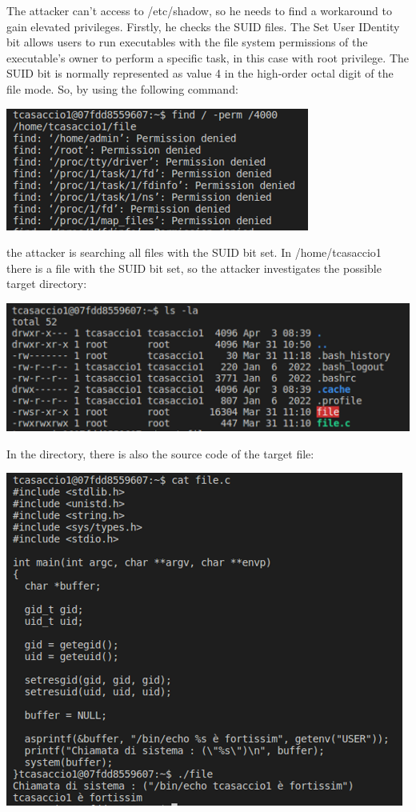 \documentclass[a4paper, 12pt, oneside]{extbook}
\begin{document}
The attacker can't access to /etc/shadow, so he needs to find a workaround to gain elevated privileges. 
Firstly, he checks the SUID files.
\newline The Set User IDentity bit allows users to run executables with the file system permissions
of the executable's owner to perform a specific task, in this case with root privilege.
The SUID bit is normally represented as value 4 in the high-order octal digit of the file mode.
\newline So, by using the following command:
\begin{center}
  \includegraphics[scale=1]{../Image/privilege_escalation_suid.PNG}
\end{center}
the attacker is searching all files with the SUID bit set. In /home/tcasaccio1 there is a file with the SUID bit set,
so the attacker investigates the possible target directory:
\begin{center}
  \includegraphics[scale=1]{../Image/privilege_escalation_suid2.PNG}
\end{center}
In the directory, there is also the source code of the target file:
\begin{center}
  \includegraphics[scale=1]{../Image/privilege_escalation_program.PNG}
\end{center}
\end{document}
